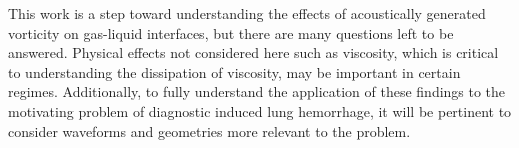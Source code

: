 This work is a step toward understanding the effects of acoustically
generated vorticity on gas-liquid interfaces, but there are many
questions left to be answered. Physical effects not considered here
such as viscosity, which is critical to understanding the dissipation
of viscosity, may be important in certain
regimes. Additionally, to fully understand the application of these
findings to the motivating problem of diagnostic induced lung
hemorrhage, it will be pertinent to consider waveforms and geometries
more relevant to the problem.










